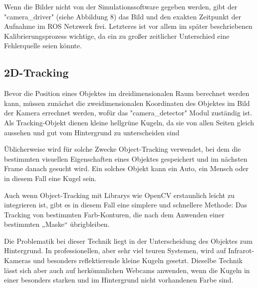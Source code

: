 \documentclass[12pt, ngerman]{article}
\begin{document}
Wenn die Bilder nicht von der Simulationssoftware gegeben werden, gibt der "camera\_driver" (siehe Abbildung 8) das Bild und den exakten Zeitpunkt der Aufnahme im ROS Netzwerk frei. Letzteres ist vor allem im später beschriebenen Kalibrierungsprozess wichtige, da ein zu großer zeitlicher Unterschied eine Fehlerquelle seien könnte.

\subsection{2D-Tracking}
Bevor die Position eines Objektes im dreidimensionalen Raum berechnet werden kann, müssen zunächst die zweidimensionalen Koordinaten des Objektes im Bild der Kamera errechnet werden, wofür das "camera\_detector" Modul zuständig ist. Als Tracking-Objekt dienen kleine hellgrüne Kugeln, da sie von allen Seiten gleich aussehen und gut vom Hintergrund zu unterscheiden sind  

Üblicherweise wird für solche Zwecke Object-Tracking verwendet, bei dem die bestimmten visuellen Eigenschaften eines Objektes gespeichert und im nächsten Frame danach gesucht wird. Ein solches Objekt kann ein Auto, ein Mensch oder in diesem Fall eine Kugel sein.  

Auch wenn Object-Tracking mit Librarys wie OpenCV erstaunlich leicht zu integrieren ist, gibt es in diesem Fall eine simplere und schnellere Methode: Das Tracking von bestimmten Farb-Konturen, die nach dem Anwenden einer bestimmten „Maske“ übrigbleiben. 

Die Problematik bei dieser Technik liegt in der Unterscheidung des Objektes zum Hintergrund. In professionellen, aber sehr viel teuren Systemen, wird auf Infrarot-Kameras und besonders reflektierende kleine Kugeln gesetzt. Dieselbe Technik lässt sich aber auch auf herkömmlichen Webcams anwenden, wenn die Kugeln in einer besonders starken und im Hintergrund nicht vorhandenen Farbe sind. 
\end{document}
